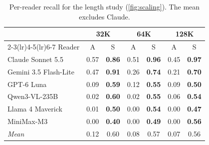\begin{table}[!htbp]
\centering\small\setlength{\tabcolsep}{4pt}
\caption{Per-reader recall for the length study (\cref{fig:scaling}). The mean excludes Claude.}
\label{tab:app_length}
\begin{tabular}{l cc cc cc}
\toprule
& \multicolumn{2}{c}{32K} & \multicolumn{2}{c}{64K} & \multicolumn{2}{c}{128K} \\
\cmidrule(lr){2-3}\cmidrule(lr){4-5}\cmidrule(lr){6-7}
Reader & A & S & A & S & A & S \\
\midrule
Claude Sonnet 5.5 & 0.57 & \textbf{0.86} & 0.51 & \textbf{0.96} & 0.45 & \textbf{0.97} \\
Gemini 3.5 Flash-Lite & 0.47 & \textbf{0.91} & 0.26 & \textbf{0.74} & 0.21 & \textbf{0.70} \\
GPT-6 Luna & 0.09 & \textbf{0.59} & 0.12 & \textbf{0.55} & 0.09 & \textbf{0.50} \\
Qwen3-VL-235B & 0.02 & \textbf{0.60} & 0.02 & \textbf{0.55} & 0.06 & \textbf{0.54} \\
Llama 4 Maverick & 0.01 & \textbf{0.50} & 0.00 & \textbf{0.54} & 0.00 & \textbf{0.47} \\
MiniMax-M3 & 0.00 & \textbf{0.40} & 0.00 & \textbf{0.49} & 0.00 & \textbf{0.56} \\
\midrule
\textit{Mean} & 0.12 & 0.60 & 0.08 & 0.57 & 0.07 & 0.56 \\
\bottomrule
\end{tabular}
\end{table}
